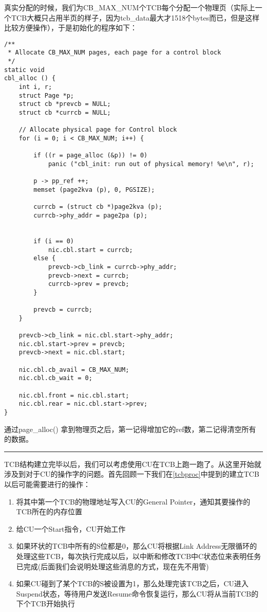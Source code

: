 \documentclass{article}
\newcommand{\funcname}[1]{{\ttfamily \small #1}}
\begin{document}
\begin{CJK*}{UTF8}{gkai}
\vspace{2em}

真实分配的时候，我们为CB\_MAX\_NUM个TCB每个分配一个物理页（实际上一个TCB大概只占用半页的样子，因为tcb\_data最大才1518个bytes而已，但是这样比较方便操作），于是初始化的程序如下：

\label{cblalloc}

\begin{lstlisting}[style=ccode, title={\scriptsize \ttfamily \bfseries kern/e100.c: cbl\_alloc()}]
/**
 * Allocate CB_MAX_NUM pages, each page for a control block
 */
static void
cbl_alloc () {
    int i, r;
    struct Page *p;
    struct cb *prevcb = NULL;
    struct cb *currcb = NULL;

    // Allocate physical page for Control block
    for (i = 0; i < CB_MAX_NUM; i++) {

        if ((r = page_alloc (&p)) != 0)
            panic ("cbl_init: run out of physical memory! %e\n", r);

        p -> pp_ref ++;
        memset (page2kva (p), 0, PGSIZE);

        currcb = (struct cb *)page2kva (p);
        currcb->phy_addr = page2pa (p);


        if (i == 0)
            nic.cbl.start = currcb;
        else {
            prevcb->cb_link = currcb->phy_addr;
            prevcb->next = currcb;
            currcb->prev = prevcb;
        }

        prevcb = currcb;
    }

    prevcb->cb_link = nic.cbl.start->phy_addr;
    nic.cbl.start->prev = prevcb;
    prevcb->next = nic.cbl.start;

    nic.cbl.cb_avail = CB_MAX_NUM;
    nic.cbl.cb_wait = 0;

    nic.cbl.front = nic.cbl.start;
    nic.cbl.rear = nic.cbl.start->prev;
}
\end{lstlisting}

通过\funcname{page\_alloc()} 拿到物理页之后，第一记得增加它的ref数，第二记得清空所有的数据。

\vspace{2em}
\hrule
\vspace{2em}

TCB结构建立完毕以后，我们可以考虑使用CU在TCB上跑一跑了。从这里开始就涉及到对于CU的操作字的问题。首先回顾一下我们在\ref{tcbproc}中提到的建立TCB以后可能需要进行的操作：

\begin{enumerate}
\item{将其中第一个TCB的物理地址写入CU的General Pointer，通知其要操作的TCB所在的内存位置}
\item{给CU一个Start指令，CU开始工作}
\item{如果环状的TCB中所有的S位都是0，那么CU将根据Link Address无限循环的处理这些TCB，每次执行完成以后，以中断和修改TCB中C状态位来表明任务已完成(后面我们会说明处理这些消息的方式，现在先不用管)}
\item{如果CU碰到了某个TCB的S被设置为1，那么处理完该TCB之后，CU进入Suspend状态，等待用户发送Resume命令恢复运行，那么CU将从当前TCB的下个TCB开始执行}
\end{enumerate}


\end{CJK*}
\end{document}
